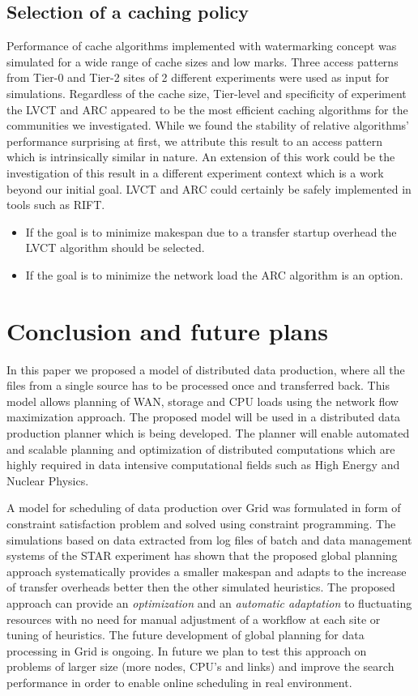 \documentclass[english]{ddny}
\begin{document}
\subsection{Selection of a caching policy}
Performance of cache algorithms implemented with watermarking concept was simulated for a wide range of cache sizes and low marks. Three access patterns from Tier-0 and Tier-2 sites of 2 different experiments were used as input for simulations.
Regardless of the cache size, Tier-level and specificity of experiment the LVCT and ARC appeared to be the most efficient  caching algorithms for the communities we investigated. While we found the stability of relative  algorithms' performance surprising at first, we attribute this result to an access pattern which is intrinsically similar in nature.
An extension of this work could be the investigation of this result in a different experiment context which is a work beyond our initial goal. LVCT and ARC could certainly be safely implemented in tools such as RIFT.
\begin{itemize}
	\item If the goal is to minimize makespan due to a transfer startup overhead the LVCT algorithm should be selected.
	\item If the goal is to minimize the network load the ARC algorithm is an option.
\end{itemize}



\section{Conclusion and future plans}
In this paper we proposed a model of distributed data production, where all the files from a single source has to be processed once and transferred back. This model allows planning of WAN, storage and CPU loads using the network flow maximization approach. The proposed model will be used in a distributed data production planner which is being developed. The planner will enable automated and scalable planning and optimization of distributed computations which are highly required in data intensive computational fields such as High Energy and Nuclear Physics.

A model for scheduling of data production over Grid was formulated in form of constraint satisfaction problem and solved using constraint programming. 
The simulations based on data extracted from log files of batch and data management systems of the STAR experiment has shown that the proposed global planning approach systematically provides a smaller makespan and adapts to the increase of transfer overheads better then the other simulated  heuristics.
The proposed approach can provide an \textit{optimization} and an \textit{automatic adaptation} to fluctuating resources with no need for manual adjustment of a workflow at each site or tuning of heuristics.
The future development of global planning for data processing in Grid is ongoing. In future we plan to test this approach on problems of larger size (more nodes, CPU's and links) and improve the search performance in order to enable online scheduling in real environment. 
\end{document}
